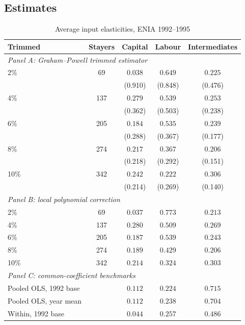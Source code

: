 \documentclass{article}
\begin{document}
\subsection{Estimates}

\begin{table}[t]
\centering
\caption{Average input elasticities, ENIA 1992--1995}
\label{tab:main}
\begin{tabular}{lcccc}
\toprule
Trimmed & Stayers & Capital & Labour & Intermediates \\
\midrule
\multicolumn{5}{l}{\emph{Panel A: Graham--Powell trimmed estimator}} \\
\phantom{0}2\% & \phantom{0}69 & $0.038$ & $0.649$ & $0.225$ \\
               &     & (0.910) & (0.848) & (0.476) \\
\phantom{0}4\% & 137 & $0.279$ & $0.539$ & $0.253$ \\
               &     & (0.362) & (0.503) & (0.238) \\
\phantom{0}6\% & 205 & $0.184$ & $0.535$ & $0.239$ \\
               &     & (0.288) & (0.367) & (0.177) \\
\phantom{0}8\% & 274 & $0.217$ & $0.367$ & $0.206$ \\
               &     & (0.218) & (0.292) & (0.151) \\
10\%           & 342 & $0.242$ & $0.222$ & $0.306$ \\
               &     & (0.214) & (0.269) & (0.140) \\
\midrule
\multicolumn{5}{l}{\emph{Panel B: local polynomial correction}} \\
\phantom{0}2\% & \phantom{0}69 & $0.037$ & $0.773$ & $0.213$ \\
\phantom{0}4\% & 137 & $0.280$ & $0.509$ & $0.269$ \\
\phantom{0}6\% & 205 & $0.187$ & $0.539$ & $0.243$ \\
\phantom{0}8\% & 274 & $0.189$ & $0.429$ & $0.206$ \\
10\%           & 342 & $0.214$ & $0.324$ & $0.303$ \\
\midrule
\multicolumn{5}{l}{\emph{Panel C: common-coefficient benchmarks}} \\
Pooled OLS, 1992 base & & $0.112$ & $0.224$ & $0.715$ \\
Pooled OLS, year mean & & $0.112$ & $0.238$ & $0.704$ \\
Within, 1992 base     & & $0.044$ & $0.257$ & $0.486$ \\
\bottomrule
\end{tabular}


\end{table}
\end{document}
